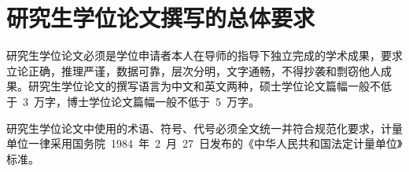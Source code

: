 
\chapter{研究生学位论文撰写的总体要求}
研究生学位论文必须是学位申请者本人在导师的指导下独立完成的学术成果，要求立论正确，推理严谨，数据可靠，层次分明，文字通畅，不得抄袭和剽窃他人成果。研究生学位论文的撰写语言为中文和英文两种，硕士学位论文篇幅一般不低于~3~万字，博士学位论文篇幅一般不低于~5~万字。

研究生学位论文中使用的术语、符号、代号必须全文统一并符合规范化要求，计量单位一律采用国务院~1984~年~2~月~27~日发布的《中华人民共和国法定计量单位》标准。

